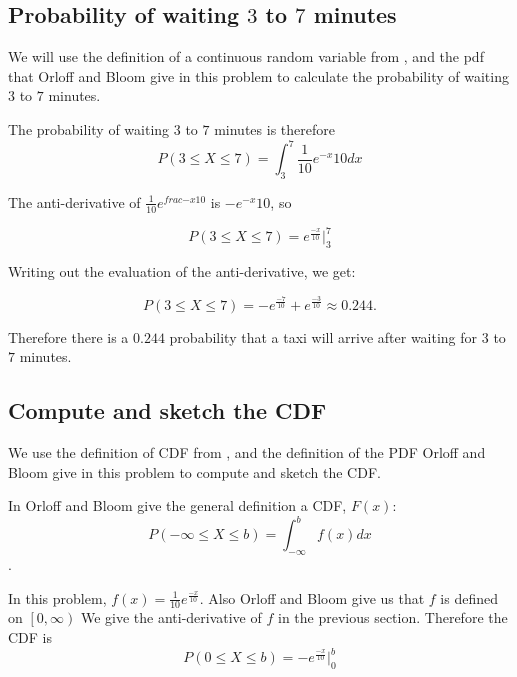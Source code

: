 \documentclass[a4paper,11pt]{article}
\begin{document}
\subsection{Probability of waiting $3$ to $7$ minutes}
We will use the definition of a continuous random variable
from \cite{reading5b}, and the pdf that Orloff and Bloom give
in this problem to calculate the probability of waiting $3$
to $7$ minutes.

The probability of waiting $3$ to $7$ minutes is therefore
\begin{equation}
P \left( 3 \leq X \leq 7 \right)
  = \int_{3}^{7} \frac{1}{10}e^{-x}{10} dx
\end{equation}

The anti-derivative of $\frac{1}{10}e^{frac{-x}{10}}$ is
$-e^{-x}{10}$, \cite{expInt} so

\begin{equation}
P \left( 3 \leq X \leq 7 \right)
  = e^{\frac{-x}{10}} \bigg\rvert_{3}^{7}
\end{equation}

Writing out the evaluation of the anti-derivative, we get:

\begin{equation}
P \left( 3 \leq X \leq 7 \right)
  = -e^{\frac{-7}{10}} + e^{\frac{-3}{10}} \approx 0.244.
\end{equation}

Therefore there is a $0.244$ probability that a taxi will
arrive after waiting for $3$ to $7$ minutes.

\subsection{Compute and sketch the CDF}

We use the definition of CDF from \cite{reading5b}, and the definition
of the PDF Orloff and Bloom give in this problem to compute
and sketch the CDF.

In \cite{reading5b} Orloff and Bloom give the general definition a CDF,
 $F\left( x \right)$:
\begin{equation}
P \left( -\infty \leq X \leq b \right) = \int_{-\infty}^{b} f \left( x \right) dx
\end{equation}.

In this problem, $f \left( x \right) = \frac{1}{10}e^{\frac{-x}{10}}$. Also
Orloff and Bloom give us that $f$ is defined on $\left[ 0, \infty \right)$
We give the anti-derivative of $f$ in the previous section.
Therefore the CDF is
\begin{equation}
P \left( 0 \leq X \leq b \right) = -e^{\frac{-x}{10}} \bigg\rvert_{0}^{b}
\end{equation}
\end{document}
